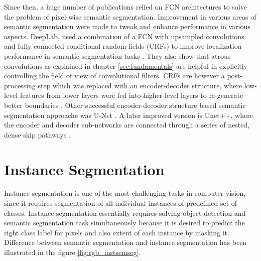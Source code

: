  Since then, a huge number of publications relied on FCN architectures to solve the problem of pixel-wise semantic segmentation. Improvement in various areas of semantic segmentation were made to tweak and enhance performance in various aspects. DeepLab, used a combination of a FCN with upsampled convolutions and fully connected conditional random fields (CRFs) to improve localization performance in semantic segmentation tasks \cite{Chen2018}. They also show that atrous convolutions as explained in chapter \ref{sec:fundamentals} are helpful in explicitly controlling the field of view of convolutional filters.
 CRFs are however a post-processing step which was replaced with an encoder-decoder structure, where low-level features from lower layers were fed into higher-level layers to re-generate better boundaries \cite{Deeplabv3+:journals/corr/abs-1802-02611}. Other successful encoder-decoder structure based semantic segmentation approache was U-Net \cite{Ronneberger2015}. A later improved version is Unet++, where the encoder and decoder sub-networks are connected through a series of nested, dense skip pathways \cite{Zhou2018}.

\section{Instance Segmentation}
Instance segmentation is one of the most challenging tasks in computer vision, since it requires segmentation of all individual instances of predefined set of classes. Instance segmentation essentially requires solving object detection and semantic segmentation task simultaneously because it is desired to predict the right class label for pixels and also extent of each instance by masking it. Difference between semantic segmentation and instance segmentation has been illustrated in the figure \ref{fig:rgb_instsemseg}.

